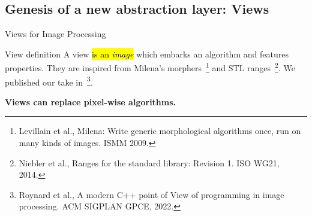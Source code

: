 \documentclass[12pt,aspectratio=169]{beamer}
\makeatletter
\let\HL\hl
\renewcommand\hl{%
  \let\set@color\beamerorig@set@color
  \let\reset@color\beamerorig@reset@color
  \HL}
\makeatother
\begin{document}
\subsection{Genesis of a new abstraction layer: Views}

\begin{frame}[fragile]{Views for Image Processing}
  \begin{alertblock}{View definition}
    A view \hl{is an \emph{image}} which embarks an algorithm and features properties. They are inspired from Milena's
    morphers~\footnote{Levillain et al., Milena: Write generic morphological algorithms once, run on many kinds of
      images. ISMM 2009.} and STL ranges~\footnote{Niebler et al., Ranges for the standard library: Revision 1. ISO WG21,
      2014.}. We published our take in~\footnote{Roynard et al., A modern C++ point of View of programming in image
      processing. ACM SIGPLAN GPCE, 2022.}.

  \end{alertblock}
  \begin{center}\textbf{Views can replace pixel-wise algorithms.}\end{center}
  \pdfcomment[icon=Note]{   }
  \pdfcomment[icon=Note]{   }
  \pdfcomment[icon=Note]{   }
\end{frame}

\end{document}
